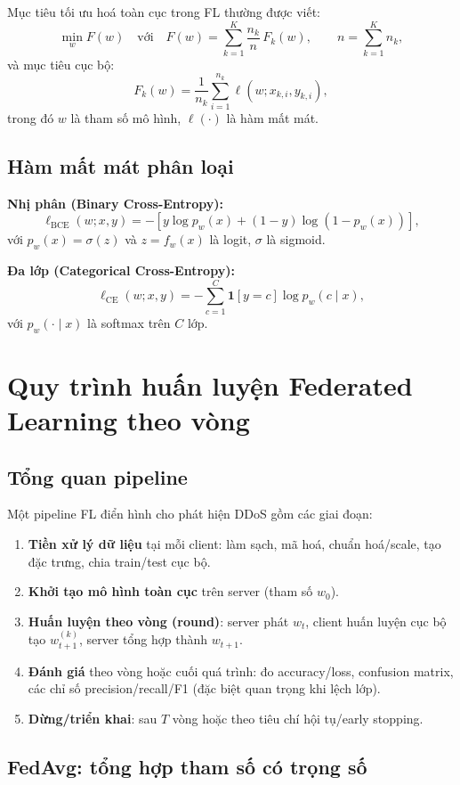 \documentclass[12pt,a4paper]{article}
\begin{document}
Mục tiêu tối ưu hoá toàn cục trong FL thường được viết:
\[
\min_{w} F(w) \quad \text{với} \quad
F(w)=\sum_{k=1}^{K}\frac{n_k}{n}\,F_k(w), \qquad n=\sum_{k=1}^{K}n_k,
\]
và mục tiêu cục bộ:
\[
F_k(w)=\frac{1}{n_k}\sum_{i=1}^{n_k}\ell\!\left(w; x_{k,i}, y_{k,i}\right),
\]
trong đó $w$ là tham số mô hình, $\ell(\cdot)$ là hàm mất mát.

\subsection{Hàm mất mát phân loại}

\textbf{Nhị phân (Binary Cross-Entropy):}
\[
\ell_{\text{BCE}}(w;x,y) = -\left[y\log p_w(x) + (1-y)\log(1-p_w(x))\right],
\]
với $p_w(x)=\sigma(z)$ và $z=f_w(x)$ là logit, $\sigma$ là sigmoid.

\textbf{Đa lớp (Categorical Cross-Entropy):}
\[
\ell_{\text{CE}}(w;x,y) = -\sum_{c=1}^{C}\mathbf{1}[y=c]\log p_w(c\mid x),
\]
với $p_w(\cdot\mid x)$ là softmax trên $C$ lớp.

\section{Quy trình huấn luyện Federated Learning theo vòng}

\subsection{Tổng quan pipeline}

Một pipeline FL điển hình cho phát hiện DDoS gồm các giai đoạn:
\begin{enumerate}
    \item \textbf{Tiền xử lý dữ liệu} tại mỗi client: làm sạch, mã hoá, chuẩn hoá/scale, tạo đặc trưng, chia train/test cục bộ.
    \item \textbf{Khởi tạo mô hình toàn cục} trên server (tham số $w_0$).
    \item \textbf{Huấn luyện theo vòng (round)}: server phát $w_t$, client huấn luyện cục bộ tạo $w_{t+1}^{(k)}$, server tổng hợp thành $w_{t+1}$.
    \item \textbf{Đánh giá} theo vòng hoặc cuối quá trình: đo accuracy/loss, confusion matrix, các chỉ số precision/recall/F1 (đặc biệt quan trọng khi lệch lớp).
    \item \textbf{Dừng/triển khai}: sau $T$ vòng hoặc theo tiêu chí hội tụ/early stopping.
\end{enumerate}

\subsection{FedAvg: tổng hợp tham số có trọng số}
\end{document}

